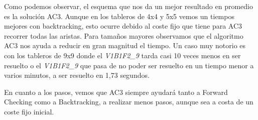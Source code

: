 \documentclass[12pt]{article}
\begin{document}
Como podemos observar, el esquema que nos da un mejor resultado en promedio es la solución AC3. Aunque en los tableros de
4x4 y 5x5 vemos un tiempos mejores con backtracking, esto ocurre debido al coste fijo que tiene para AC3 recorrer todas las
aristas. Para tamaños mayores observamos que el algoritmo AC3 nos ayuda a reducir en gran magnitud el tiempo.
 Un caso muy notorio es con los tableros de 
 9x9 donde el \textit{V1B1F2\_9} tarda casi 10 veces menos en ser resuelto o el \textit{V1B1F2\_9} que pasa de
no poder ser resuelto en un tiempo menor a varios minutos, a ser resuelto en 1,73 segundos. 

En cuanto a los pasos, vemos que AC3 siempre ayudará tanto a Forward Checking como a Backtracking, a realizar menos pasos,
aunque sea a costa de un coste fijo inicial. 
\end{document}
